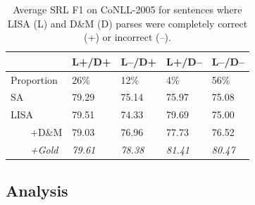 \documentclass[11pt,a4paper]{article}
\begin{document}
\begin{table}

\begin{tabular}{lllll}
& L+/D+ & L--/D+ & L+/D-- & L--/D-- \\ \hline \hline
Proportion & 26\% &	12\% &	4\% &	56\% \\ \hline
SA & 79.29 & 75.14	& 75.97 &	75.08 \\ 
LISA & 79.51 &	74.33 &	79.69 &	75.00 \\
\ \ \ \ +D\&M & 79.03 &	76.96 &	77.73 &	76.52 \\
\ \ \ \ \emph{+Gold} & \emph{79.61} & \emph{78.38} & \emph{81.41} & \emph{80.47} \\
\end{tabular}
\caption{Average SRL F1 on CoNLL-2005 for sentences where LISA (L) and D\&M (D) parses were completely correct (+) or incorrect (--). \label{tab:parse-srl-by-sents}}
\end{table}

\subsection{Analysis \label{sec:analysis}}

\end{document}
